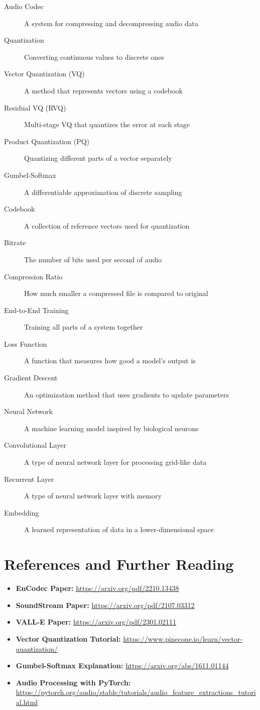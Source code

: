 \documentclass[12pt]{article}
\begin{document}
\begin{description}
    \item[Audio Codec] A system for compressing and decompressing audio data
    \item[Quantization] Converting continuous values to discrete ones
    \item[Vector Quantization (VQ)] A method that represents vectors using a codebook
    \item[Residual VQ (RVQ)] Multi-stage VQ that quantizes the error at each stage
    \item[Product Quantization (PQ)] Quantizing different parts of a vector separately
    \item[Gumbel-Softmax] A differentiable approximation of discrete sampling
    \item[Codebook] A collection of reference vectors used for quantization
    \item[Bitrate] The number of bits used per second of audio
    \item[Compression Ratio] How much smaller a compressed file is compared to original
    \item[End-to-End Training] Training all parts of a system together
    \item[Loss Function] A function that measures how good a model's output is
    \item[Gradient Descent] An optimization method that uses gradients to update parameters
    \item[Neural Network] A machine learning model inspired by biological neurons
    \item[Convolutional Layer] A type of neural network layer for processing grid-like data
    \item[Recurrent Layer] A type of neural network layer with memory
    \item[Embedding] A learned representation of data in a lower-dimensional space
\end{description}

\section{References and Further Reading}

\begin{itemize}
    \item \textbf{EnCodec Paper:} \url{https://arxiv.org/pdf/2210.13438}
    \item \textbf{SoundStream Paper:} \url{https://arxiv.org/pdf/2107.03312}
    \item \textbf{VALL-E Paper:} \url{https://arxiv.org/pdf/2301.02111}
    \item \textbf{Vector Quantization Tutorial:} \url{https://www.pinecone.io/learn/vector-quantization/}
    \item \textbf{Gumbel-Softmax Explanation:} \url{https://arxiv.org/abs/1611.01144}
    \item \textbf{Audio Processing with PyTorch:} \url{https://pytorch.org/audio/stable/tutorials/audio_feature_extractions_tutorial.html}
\end{itemize}
\end{document}
